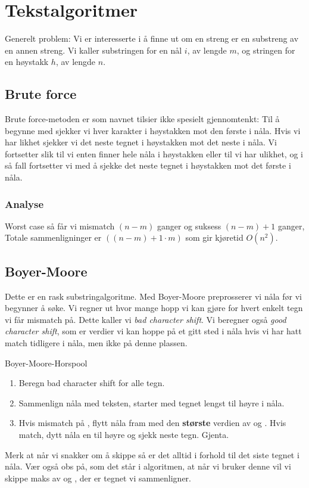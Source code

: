 \section{Tekstalgoritmer}
	Generelt problem: Vi er interesserte i å finne ut om en streng er en substreng av en annen streng. Vi kaller substringen for en nål $i$, av lengde $m$, og stringen for en høystakk $h$, av lengde $n$.

	\subsection{Brute force}
		Brute force-metoden er som navnet tilsier ikke spesielt gjennomtenkt: Til å begynne med sjekker vi hver karakter i høystakken mot den første i nåla. Hvis vi har likhet sjekker vi det neste tegnet i høystakken mot det neste i nåla. Vi fortsetter slik til vi enten finner hele nåla i høystakken eller til vi har ulikhet, og i så fall fortsetter vi med å sjekke det neste tegnet i høystakken mot det første i nåla.

	\subsubsection{Analyse}
		Worst case så får vi mismatch $(n-m)$ ganger og suksess $(n-m)+1$ ganger, Totale sammenligninger er $((n-m)+1 \cdot m)$ som gir kjøretid $O(n^2)$.

	\subsection{Boyer-Moore}
		Dette er en rask substringalgoritme. Med Boyer-Moore preprosserer vi nåla før vi begynner å søke. Vi regner ut hvor mange hopp vi kan gjøre for hvert enkelt tegn vi får mismatch på. Dette kaller vi \textit{bad character shift}. Vi beregner også \textit{good character shift}, som er verdier vi kan hoppe på et gitt sted i nåla hvis vi har hatt match tidligere i nåla, men ikke på denne plassen. 
		
		\begin{theorem} Boyer-Moore-Horspool
			\begin{enumerate}
				\item Beregn bad character shift for alle tegn.
				\item Sammenlign nåla med teksten, starter med tegnet lengst til høyre i nåla.
				\item Hvis mismatch på , flytt nåla fram med den \textbf{største} verdien av  og . Hvis match, dytt nåla en til høyre og sjekk neste tegn. Gjenta.
			\end{enumerate}
		\end{theorem}
		Merk at når vi snakker om å skippe så er det alltid i forhold til det siste tegnet i nåla. Vær også obs på, som det står i algoritmen, at når vi bruker denne vil vi skippe maks av  og , der  er tegnet vi sammenligner.

